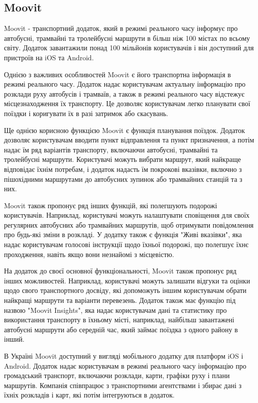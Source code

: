 \subsection{Moovit}
\label{subsec:moovit-subsection}

Moovit - транспортний додаток, який в режимі реального часу інформує про автобусні, трамвайні та тролейбусні маршрути в більш ніж 100 містах по всьому світу. Додаток завантажили понад 100 мільйонів користувачів і він доступний для пристроїв на iOS та Android.

Однією з важливих особливостей Moovit є його транспортна інформація в режимі реального часу. Додаток надає користувачам актуальну інформацію про розклади руху автобусів і трамваїв, а також в режимі реального часу відстежує місцезнаходження їх транспорту. Це дозволяє користувачам легко планувати свої поїздки і коригувати їх в разі затримок або скасувань.

Ще однією корисною функцією Moovit є функція планування поїздок. Додаток дозволяє користувачам вводити пункт відправлення та пункт призначення, а потім надає їм ряд варіантів транспорту, включаючи автобусні, трамвайні та тролейбусні маршрути. Користувачі можуть вибрати маршрут, який найкраще відповідає їхнім потребам, і додаток надасть їм покрокові вказівки, включно з пішохідними маршрутами до автобусних зупинок або трамвайних станцій та з них.

Moovit також пропонує ряд інших функцій, які полегшують подорожі користувачів. Наприклад, користувачі можуть налаштувати сповіщення для своїх регулярних автобусних або трамвайних маршрутів, щоб отримувати повідомлення про будь-які зміни в розкладі. У додатку також є функція "Живі вказівки", яка надає користувачам голосові інструкції щодо їхньої подорожі, що полегшує їхнє проходження, навіть якщо вони незнайомі з місцевістю.

На додаток до своєї основної функціональності, Moovit також пропонує ряд інших можливостей. Наприклад, користувачі можуть залишати відгуки та оцінки щодо свого транспортного досвіду, які допоможуть іншим користувачам обрати найкращі маршрути та варіанти перевезень. Додаток також має функцію під назвою "Moovit Insights", яка надає користувачам дані та статистику про використання транспорту в їхньому місті, наприклад, найбільш завантажені автобусні маршрути або середній час, який займає поїздка з одного району в інший.

В Україні Moovit доступний у вигляді мобільного додатку для платформ iOS і Android. Додаток надає користувачам в режимі реального часу інформацію про громадський транспорт, включаючи розклади, карти, графіки руху і плани маршрутів.  Компанія співпрацює з транспортними агентствами і збирає дані з їхніх розкладів і карт, які потім інтегруються в додаток.

